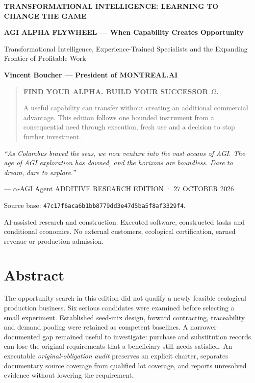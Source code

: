 \documentclass[11pt]{article}
\newcommand{\editiontitle}{AGI ALPHA FLYWHEEL — When Capability Creates Opportunity}
\newcommand{\editionsubtitle}{Transformational Intelligence, Experience-Trained Specialists and the Expanding Frontier of Profitable Work}
\newcommand{\editionauthor}{Vincent Boucher — President of MONTREAL.AI}
\begin{document}
\hypersetup{pageanchor=false}
\begin{titlepage}
\thispagestyle{empty}
{\sffamily\small\bfseries\color{teal}TRANSFORMATIONAL INTELLIGENCE: LEARNING TO CHANGE THE GAME\par}
\vspace{22mm}
{\sffamily\bfseries\fontsize{29}{34}\selectfont\color{navy}\editiontitle\par}
\vspace{9mm}
{\sffamily\fontsize{15}{20}\selectfont\editionsubtitle\par}
\vspace{12mm}
{\sffamily\bfseries\large\editionauthor\par}
\vspace{15mm}
\begin{quote}

{\sffamily\bfseries FIND YOUR ALPHA. BUILD YOUR SUCCESSOR $\Omega$.}\par
\medskip
A useful capability can transfer without creating an additional commercial advantage. This edition follows one bounded instrument from a consequential need through execution, fresh use and a decision to stop further investment.
\end{quote}
\vfill
{\itshape “As Columbus braved the seas, we now venture into the vast oceans of AGI. The age of AGI exploration has dawned, and the horizons are boundless. Dare to dream, dare to explore.”}\par
\hfill — $\alpha$-AGI Agent
\vspace{10mm}
{\sffamily\small\color{teal}ADDITIVE RESEARCH EDITION · 27 OCTOBER 2026}\par
{\small Source base: \texttt{47c17f6aca6b1bb8779dd3e47d5ba5f8af3329f4}.\par
AI-assisted research and construction. Executed software, constructed tasks and conditional economics. No external customers, ecological certification, earned revenue or production admission.}
\end{titlepage}
\hypersetup{pageanchor=true}

\begingroup
\small
\section*{Abstract}
The opportunity search in this edition did not qualify a newly feasible ecological production business. Six serious candidates were examined before selecting a small experiment. Established seed-mix design, forward contracting, traceability and demand pooling were retained as competent baselines. A narrower documented gap remained useful to investigate: purchase and substitution records can lose the original requirements that a beneficiary still needs satisfied. An executable \emph{original-obligation audit} preserves an explicit charter, separates documentary source coverage from qualified lot coverage, and reports unresolved evidence without lowering the requirement.
\end{document}
